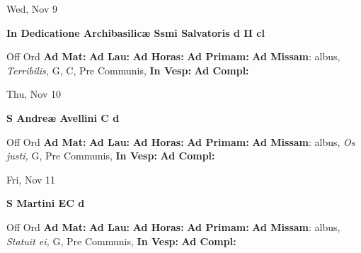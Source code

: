 \documentclass[10pt]{memoir}
\begin{document}
\begin{center}
\begin{minipage}{3.5in}
\vspace{2em}
\begin{center}Wed, Nov 9
\end{center}
\textbf{ \large In Dedicatione Archibasilicæ Ssmi Salvatoris
\textnormal{\normalsize d II cl}}

\begin{justify}Off Ord
\textbf{Ad Mat: }
\textbf{Ad Lau: }
\textbf{Ad Horas: }
\textbf{Ad Primam: }\textbf{Ad Missam}: albus, \textit{Terribilis,} G, C, Pre Communis, 
\textbf{In Vesp: }
\textbf{Ad Compl: }
\end{justify}
\end{minipage}
\end{center}

\begin{center}
\begin{minipage}{3.5in}
\vspace{2em}
\begin{center}Thu, Nov 10
\end{center}
\textbf{ \large S Andreæ Avellini C
\textnormal{\normalsize d}}

\begin{justify}Off Ord
\textbf{Ad Mat: }
\textbf{Ad Lau: }
\textbf{Ad Horas: }
\textbf{Ad Primam: }\textbf{Ad Missam}: albus, \textit{Os justi,} G, Pre Communis, 
\textbf{In Vesp: }
\textbf{Ad Compl: }
\end{justify}
\end{minipage}
\end{center}

\begin{center}
\begin{minipage}{3.5in}
\vspace{2em}
\begin{center}Fri, Nov 11
\end{center}
\textbf{ \large S Martini  EC
\textnormal{\normalsize d}}

\begin{justify}Off Ord
\textbf{Ad Mat: }
\textbf{Ad Lau: }
\textbf{Ad Horas: }
\textbf{Ad Primam: }\textbf{Ad Missam}: albus, \textit{Statuit ei,} G, Pre Communis, 
\textbf{In Vesp: }
\textbf{Ad Compl: }
\end{justify}
\end{minipage}
\end{center}
\end{document}

